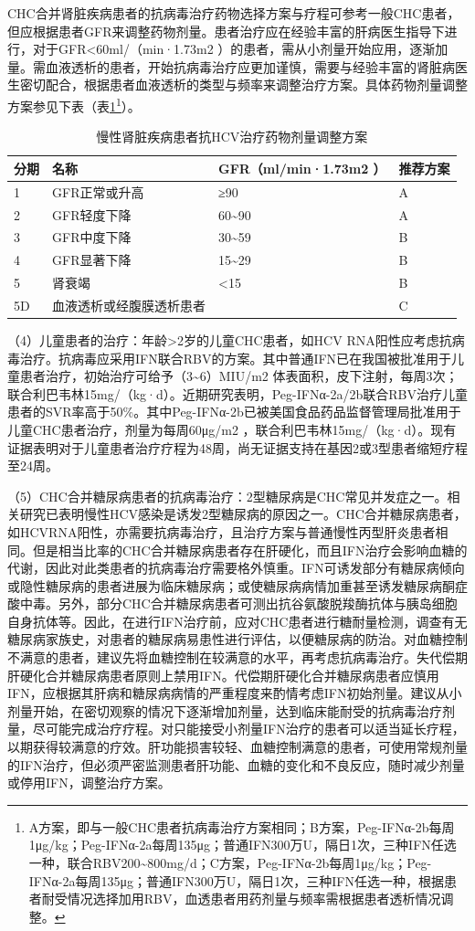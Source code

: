 CHC合并肾脏疾病患者的抗病毒治疗药物选择方案与疗程可参考一般CHC患者，但应根据患者GFR来调整药物剂量。患者治疗应在经验丰富的肝病医生指导下进行，对于GFR\textless{}60ml/（min·1.73m{2}
）的患者，需从小剂量开始应用，逐渐加量。需血液透析的患者，开始抗病毒治疗应更加谨慎，需要与经验丰富的肾脏病医生密切配合，根据患者血液透析的类型与频率来调整治疗方案。具体药物剂量调整方案参见下表（表\ref{tab3-10-6}\footnote{A方案，即与一般CHC患者抗病毒治疗方案相同；B方案，Peg-IFNα-2b每周1μg/kg；Peg-IFNα-2a每周135μg；普通IFN300万U，隔日1次，三种IFN任选一种，联合RBV200\textasciitilde{}800mg/d；C方案，Peg-IFNα-2b每周1μg/kg；Peg-IFNα-2a每周135μg；普通IFN300万U，隔日1次，三种IFN任选一种，根据患者耐受情况选择加用RBV，血透患者用药剂量与频率需根据患者透析情况调整。}）。

\begin{table}[htbp]
    \centering
    \caption{慢性肾脏疾病患者抗HCV治疗药物剂量调整方案}
    \label{tab3-10-6}
    \begin{tabular}{llll}
\toprule
分期 & 名称 & GFR（ml/min·1.73m{2} ） & 推荐方案\tabularnewline
\midrule
1 & GFR正常或升高 & ≥90 & A\tabularnewline
2 & GFR轻度下降 & 60\textasciitilde{}90 & A\tabularnewline
3 & GFR中度下降 & 30\textasciitilde{}59 & B\tabularnewline
4 & GFR显著下降 & 15\textasciitilde{}29 & B\tabularnewline
5 & 肾衰竭 & \textless{}15 & B\tabularnewline
5D & 血液透析或经腹膜透析患者 & & C\tabularnewline
\bottomrule
    \end{tabular}
\end{table}

（4）儿童患者的治疗：年龄\textgreater{}2岁的儿童CHC患者，如HCV
RNA阳性应考虑抗病毒治疗。抗病毒应采用IFN联合RBV的方案。其中普通IFN已在我国被批准用于儿童患者治疗，初始治疗可给予（3\textasciitilde{}6）MIU/m{2}
体表面积，皮下注射，每周3次；联合利巴韦林15mg/（kg·d）。近期研究表明，Peg-IFNα-2a/2b联合RBV治疗儿童患者的SVR率高于50\%。其中Peg-IFNα-2b已被美国食品药品监督管理局批准用于儿童CHC患者治疗，剂量为每周60μg/m{2}
，联合利巴韦林15mg/（kg·d）。现有证据表明对于儿童患者治疗疗程为48周，尚无证据支持在基因2或3型患者缩短疗程至24周。

（5）CHC合并糖尿病患者的抗病毒治疗：2型糖尿病是CHC常见并发症之一。相关研究已表明慢性HCV感染是诱发2型糖尿病的原因之一。CHC合并糖尿病患者，如HCVRNA阳性，亦需要抗病毒治疗，且治疗方案与普通慢性丙型肝炎患者相同。但是相当比率的CHC合并糖尿病患者存在肝硬化，而且IFN治疗会影响血糖的代谢，因此对此类患者的抗病毒治疗需要格外慎重。IFN可诱发部分有糖尿病倾向或隐性糖尿病的患者进展为临床糖尿病；或使糖尿病病情加重甚至诱发糖尿病酮症酸中毒。另外，部分CHC合并糖尿病患者可测出抗谷氨酸脱羧酶抗体与胰岛细胞自身抗体等。因此，在进行IFN治疗前，应对CHC患者进行糖耐量检测，调查有无糖尿病家族史，对患者的糖尿病易患性进行评估，以便糖尿病的防治。对血糖控制不满意的患者，建议先将血糖控制在较满意的水平，再考虑抗病毒治疗。失代偿期肝硬化合并糖尿病患者原则上禁用IFN。代偿期肝硬化合并糖尿病患者应慎用IFN，应根据其肝病和糖尿病病情的严重程度来酌情考虑IFN初始剂量。建议从小剂量开始，在密切观察的情况下逐渐增加剂量，达到临床能耐受的抗病毒治疗剂量，尽可能完成治疗疗程。对只能接受小剂量IFN治疗的患者可以适当延长疗程，以期获得较满意的疗效。肝功能损害较轻、血糖控制满意的患者，可使用常规剂量的IFN治疗，但必须严密监测患者肝功能、血糖的变化和不良反应，随时减少剂量或停用IFN，调整治疗方案。

